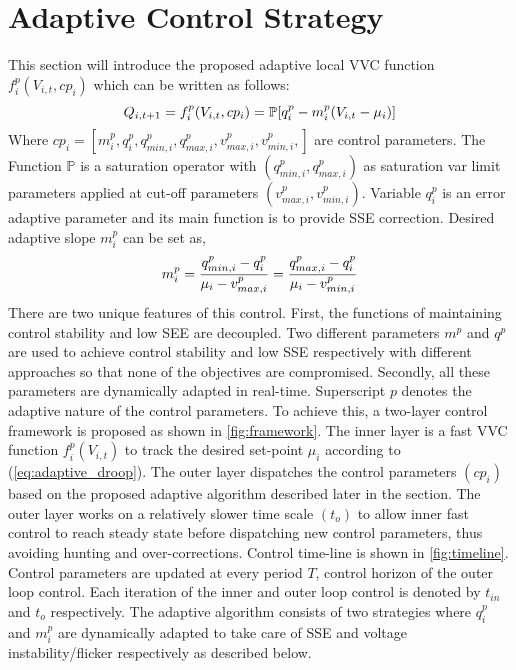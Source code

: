 \documentclass[journal]{IEEEtran}
\begin{document}
\vspace{-2mm}
\section{Adaptive Control Strategy}
This section will introduce the proposed adaptive local VVC function $f_i^p (V_{i,t},cp_i)$ which can be written as follows:
\setlength\abovedisplayskip{6pt}
\setlength\belowdisplayskip{6pt}
\begin{equation}
\small
\label{eq:adaptive_droop}
{{Q}_{i,{t+1}}}=f^p_i(V_{i,t},cp_i)=\mathbb{P}[q^p_{i}-m^p_i({{V}_{i,t}}-\mu_i)]
\end{equation}
Where {\small $cp_i=[m_i^p,q_i^p,q_{min,i}^p,q_{max,i}^p,v_{max,i}^p,v_{min,i}^p,]$} are control parameters. The Function {\small $\mathbb{P}$} is a saturation operator with {\small$(q_{min,i}^p,q_{max,i}^p)$} as saturation var limit parameters applied at cut-off parameters {\small $(v_{max,i}^p,v_{min,i}^p)$}. Variable $q_i^p$ is an error adaptive parameter and its main function is to provide SSE correction. Desired adaptive slope $m_i^p$ can be set as,
\begin{equation}
\small
\label{eq:adaptive_slope}
m_i^p=\frac{q_{min,i}^p-q_i^p}{\mu_i-v_{max,i}^p}=\frac{q_{max,i}^p-q_i^p}{\mu_i-v_{min,i}^p}
\end{equation}
There are two unique features of this control. First, the functions of maintaining control stability and low SEE are decoupled. Two different parameters $m^p$ and $q^p$ are used to achieve control stability and low SSE respectively with different approaches so that none of the objectives are compromised. Secondly, all these parameters are dynamically adapted in real-time. Superscript $p$ denotes the adaptive nature of the control parameters. To achieve this, a two-layer control framework is proposed as shown in \figurename \ref{fig:framework}. The inner layer is a fast VVC function $f_i^p (V_{i,t})$ to track the desired set-point $\mu_i$ according to (\ref{eq:adaptive_droop}).  The outer layer dispatches the control parameters $(cp_i)$ based on the proposed adaptive algorithm described later in the section. The outer layer works on a relatively slower time scale $(t_o)$ to allow inner fast control to reach steady state before dispatching new control parameters, thus avoiding hunting and over-corrections. Control time-line is shown in \figurename \ref{fig:timeline}. Control parameters are updated at every period $T$, control horizon of the outer loop control. Each iteration of the inner and outer loop control is denoted by $t_{in}$ and $t_o$ respectively. 
	The adaptive algorithm consists of two strategies where $q_i^p$ and $m_i^p$ are dynamically adapted to take care of SSE and voltage instability/flicker respectively as described below.
\end{document}
